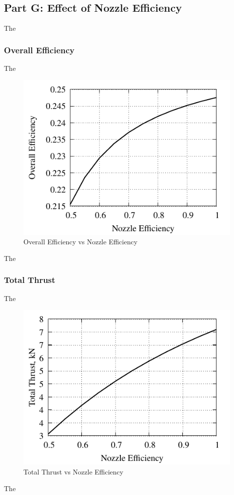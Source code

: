 \documentclass[conf]{new-aiaa} %
\begin{document}
\subsection{Part G: Effect of Nozzle Efficiency}
The

\subsubsection{Overall Efficiency}
The

\begin{figure}[hbt!]
\centering
\includegraphics[]{media/performance_parameter_files/part_g_eta_o.pdf}
\caption{\label{fig:partgetao} Overall Efficiency vs Nozzle Efficiency}
\end{figure}
The

\subsubsection{Total Thrust}
The

\begin{figure}[hbt!]
\centering
\includegraphics[]{media/performance_parameter_files/part_g_T.pdf}
\caption{\label{fig:partgt} Total Thrust vs Nozzle Efficiency}
\end{figure}
The
\end{document}
